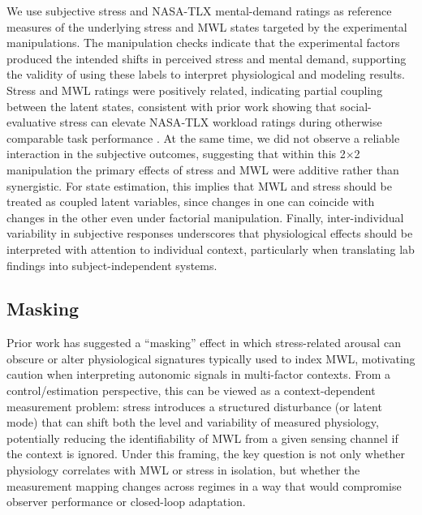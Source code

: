 \documentclass[lettersize,journal]{IEEEtran}
\begin{document}
We use subjective stress and NASA-TLX mental-demand ratings as reference measures of the underlying stress and MWL states targeted by the experimental manipulations. The manipulation checks indicate that the experimental factors produced the intended shifts in perceived stress and mental demand, supporting the validity of using these labels to interpret physiological and modeling results. Stress and MWL ratings were positively related, indicating partial coupling between the latent states, consistent with prior work showing that social-evaluative stress can elevate NASA‑TLX workload ratings during otherwise comparable task performance \cite{wetherell_psychobiological_2017}. At the same time, we did not observe a reliable interaction in the subjective outcomes, suggesting that within this 2×2 manipulation the primary effects of stress and MWL were additive rather than synergistic. For state estimation, this implies that MWL and stress should be treated as coupled latent variables, since changes in one can coincide with changes in the other even under factorial manipulation. Finally, inter-individual variability in subjective responses underscores that physiological effects should be interpreted with attention to individual context, particularly when translating lab findings into subject-independent systems.


\subsection{Masking}


Prior work has suggested a “masking” effect in which stress-related arousal can obscure or alter physiological signatures typically used to index MWL, motivating caution when interpreting autonomic signals in multi-factor contexts. From a control/estimation perspective, this can be viewed as a context-dependent measurement problem: stress introduces a structured disturbance (or latent mode) that can shift both the level and variability of measured physiology, potentially reducing the identifiability of MWL from a given sensing channel if the context is ignored. Under this framing, the key question is not only whether physiology correlates with MWL or stress in isolation, but whether the measurement mapping changes across regimes in a way that would compromise observer performance or closed-loop adaptation.

\end{document}
